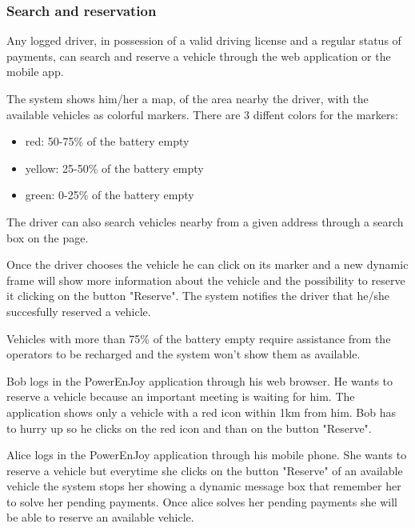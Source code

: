\subsubsection{Search and reservation}

Any logged driver, in possession of a valid driving license and a regular status of payments, can search and reserve a vehicle through the web application or the mobile app.

The system shows him/her a map, of the area nearby the driver, with the available vehicles as colorful markers. There are 3 diffent colors for the markers:
\begin{itemize}
	\item red: 50-75\% of the battery empty
	\item yellow: 25-50\% of the battery empty
	\item green: 0-25\% of the battery empty
\end{itemize}
The driver can also search vehicles nearby from a given address through a search box on the page.

Once the driver chooses the vehicle he can click on its marker and a new dynamic frame will show more information about the vehicle and the possibility to reserve it clicking on the button "Reserve".
The system notifies the driver that he/she succesfully reserved a vehicle.

Vehicles with more than 75\% of the battery empty require assistance from the operators to be recharged and the system won't show them as available. 


Bob logs in the PowerEnJoy application through his web browser. He wants to reserve a vehicle because an important meeting is waiting for him. The application shows only a vehicle with a red icon within 1km from him. Bob has to hurry up so he clicks on the red icon and than on the button "Reserve".

Alice logs in the PowerEnJoy application through his mobile phone. She wants to reserve a vehicle but everytime she clicks on the button "Reserve" of an available vehicle the system stops her showing a dynamic message box that remember her to solve her pending payments. Once alice solves her pending payments she will be able to reserve an available vehicle.

